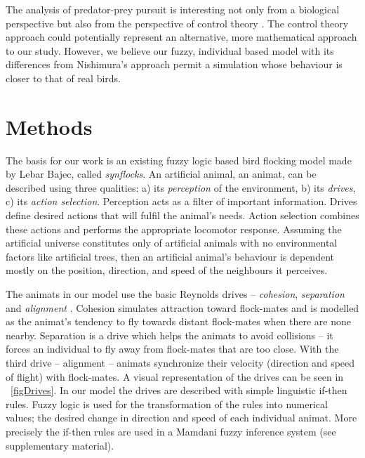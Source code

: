 The analysis of predator-prey pursuit is interesting not only from a biological perspective but also from the perspective of control theory \cite{nahin2012chases,wei2009pursuit}. The control theory approach could potentially represent an alternative, more mathematical approach to our study. However, we believe our fuzzy, individual based model with its differences from Nishimura's approach permit a simulation whose behaviour is closer to that of real birds.

\section{Methods}

The basis for our work is an existing fuzzy logic based bird flocking model made by Lebar Bajec\etal \cite{lebarbajec2005simulating}, called \emph{synflocks}. An artificial animal, an animat, can be described using three qualities: a) its \emph{perception} of the environment, b) its \emph{drives}, c) its \emph{action selection}. Perception acts as a filter of important information. Drives define desired actions that will fulfil the animal's needs. Action selection combines these actions and performs the appropriate locomotor response. Assuming the artificial universe constitutes only of artificial animals with no environmental factors like artificial trees, then an artificial animal's behaviour is dependent mostly on the position, direction, and speed of the neighbours it perceives.

The animats in our model use the basic Reynolds drives -- \emph{cohesion}, \emph{separation} and \emph{alignment} \cite{reynolds1987flocks}. Cohesion simulates attraction toward flock-mates and is modelled as the animat's tendency to fly towards distant flock-mates when there are none nearby. Separation is a drive which helps the animats to avoid collisions -- it forces an individual to fly away from flock-mates that are too close. With the third drive -- alignment -- ani\-mats synchronize their velocity (direction and speed of flight) with flock-mates. A visual representation of the drives can be seen in \figurename~\ref{figDrives}. In our model the drives are described with simple linguistic if-then rules. Fuzzy logic is used for the transformation of the rules into numerical values; the desired change in direction and speed of each individual animat. More precisely the if-then rules are used in a Mamdani fuzzy inference system \cite{mamdani1974application} (see supplementary material).


